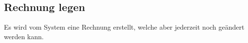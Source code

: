 \documentclass[../SubfileFeatures.tex]{subfiles}
\begin{document}
    \subsection{Rechnung legen}
    Es wird vom System eine Rechnung erstellt, welche aber jederzeit noch geändert werden kann.
\end{document}
